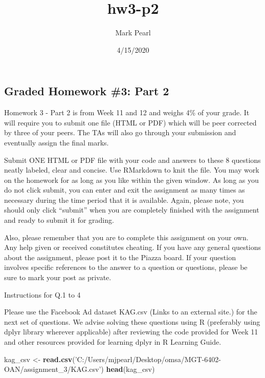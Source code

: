 \documentclass[
]{article}
\title{hw3-p2}
\author{Mark Pearl}
\date{4/15/2020}
\newenvironment{Shaded}{\begin{snugshade}}{\end{snugshade}}
\newcommand{\KeywordTok}[1]{\textcolor[rgb]{0.13,0.29,0.53}{\textbf{#1}}}
\newcommand{\NormalTok}[1]{#1}
\newcommand{\StringTok}[1]{\textcolor[rgb]{0.31,0.60,0.02}{#1}}
\begin{document}
\maketitle

\hypertarget{graded-homework-3-part-2}{%
\subsection{Graded Homework \#3: Part
2}\label{graded-homework-3-part-2}}

Homework 3 - Part 2 is from Week 11 and 12 and weighs 4\% of your grade.
It will require you to submit one file (HTML or PDF) which will be peer
corrected by three of your peers. The TAs will also go through your
submission and eventually assign the final marks.

Submit ONE HTML or PDF file with your code and answers to these 8
questions neatly labeled, clear and concise. Use RMarkdown to knit the
file. You may work on the homework for as long as you like within the
given window. As long as you do not click submit, you can enter and exit
the assignment as many times as necessary during the time period that it
is available. Again, please note, you should only click ``submit'' when
you are completely finished with the assignment and ready to submit it
for grading.

Also, please remember that you are to complete this assignment on your
own. Any help given or received constitutes cheating. If you have any
general questions about the assignment, please post it to the Piazza
board. If your question involves specific references to the answer to a
question or questions, please be sure to mark your post as private.

Instructions for Q.1 to 4

Please use the Facebook Ad dataset KAG.csv (Links to an external site.)
for the next set of questions. We advise solving these questions using R
(preferably using dplyr library wherever applicable) after reviewing the
code provided for Week 11 and other resources provided for learning
dplyr in R Learning Guide.

\begin{Shaded}
\begin{Highlighting}[]
\NormalTok{kag_csv <-}\StringTok{ }\KeywordTok{read.csv}\NormalTok{(}\StringTok{'C:/Users/mjpearl/Desktop/omsa/MGT-6402-OAN/assignment_3/KAG.csv'}\NormalTok{)}
\KeywordTok{head}\NormalTok{(kag_csv)}
\end{Highlighting}
\end{Shaded}
\end{document}
